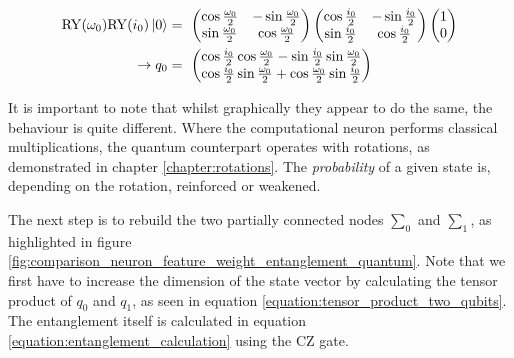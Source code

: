 \begin{equation}
    \centering
    \begin{split}
        \mathrm{RY}(\omega_0)\mathrm{RY}(i_0)\ket{0} &=\ \begin{pmatrix}
        \cos{\frac{\omega_0}{2}} & -\sin{\frac{\omega_0}{2}} \\
        \sin{\frac{\omega_0}{2}} & \cos{\frac{\omega_0}{2}}
    \end{pmatrix}\begin{pmatrix}
        \cos{\frac{i_0}{2}} & -\sin{\frac{i_0}{2}} \\
        \sin{\frac{i_0}{2}} & \cos{\frac{i_0}{2}}
    \end{pmatrix} \begin{pmatrix}
        1 \\ 0
    \end{pmatrix}\\ \rightarrow q_0 &=\ \begin{pmatrix}
     \cos\frac{i_{0}}{2}\cos\frac{\omega_{0}}{2} - \sin\frac{i_{0}}{2}\sin\frac{\omega_{0}}{2}\\
     \cos\frac{i_{0}}{2}\sin\frac{\omega_{0}}{2} + \cos\frac{\omega_{0}}{2}\sin\frac{i_{0}}{2}\\
     \end{pmatrix}
    \end{split}
    \label{equation:quantum_feature_weight}
\end{equation}

It is important to note that whilst graphically they appear to do the same, the behaviour is quite different. Where the computational neuron performs classical multiplications, the quantum counterpart operates with rotations, as demonstrated in chapter \ref{chapter:rotations}. The \emph{probability} of a given state is, depending on the rotation, reinforced or weakened.\par

The next step is to rebuild the two partially connected nodes $\sum_0$ and $\sum_1$, as highlighted in figure \ref{fig:comparison_neuron_feature_weight_entanglement_quantum}. Note that we first have to increase the dimension of the state vector by calculating the tensor product of $q_0$ and $q_1$, as seen in equation \ref{equation:tensor_product_two_qubits}. The entanglement itself is calculated in equation \ref{equation:entanglement_calculation} using the $\mathrm{CZ}$ gate.

\clearpage

